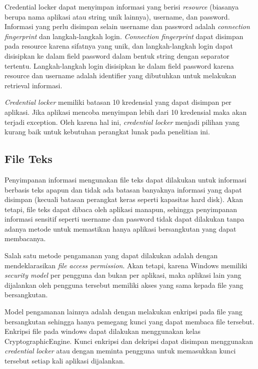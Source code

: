 Credential locker dapat menyimpan informasi yang berisi \textit{resource} (biasanya berupa nama aplikasi atau string unik lainnya), username, dan password. Informasi yang perlu disimpan selain username dan password adalah \textit{connection fingerprint} dan langkah-langkah login. \textit{Connection fingerprint} dapat disimpan pada resource karena sifatnya yang unik, dan langkah-langkah login dapat disisipkan ke dalam field password dalam bentuk string dengan separator tertentu. Langkah-langkah login disisipkan ke dalam field password karena resource dan username adalah identifier yang dibutuhkan untuk melakukan retrieval informasi.

\textit{Credential locker} memiliki batasan 10 kredensial yang dapat disimpan per aplikasi. Jika aplikasi mencoba menyimpan lebih dari 10 kredensial maka akan terjadi exception. Oleh karena hal ini, \textit{credential locker} menjadi pilihan yang kurang baik untuk kebutuhan perangkat lunak pada penelitian ini.

\subsection{File Teks}
\label{subsec:file_teks}

Penyimpanan informasi mengunakan file teks dapat dilakukan untuk informasi berbasis teks apapun dan tidak ada batasan banyaknya informasi yang dapat disimpan (kecuali batasan perangkat keras seperti kapasitas hard disk). Akan tetapi, file teks dapat dibaca oleh aplikasi manapun, sehingga penyimpanan informasi sensitif seperti username dan password tidak dapat dilakukan tanpa adanya metode untuk memastikan hanya aplikasi bersangkutan yang dapat membacanya.

Salah satu metode pengamanan yang dapat dilakukan adalah dengan mendeklarasikan \textit{file access permission}. Akan tetapi, karena Windows memiliki \textit{security model} per pengguna dan bukan per aplikasi, maka aplikasi lain yang dijalankan oleh pengguna tersebut memiliki akses yang sama kepada file yang bersangkutan.

Model pengamanan lainnya adalah dengan melakukan enkripsi pada file yang bersangkutan sehingga hanya pemegang kunci yang dapat membaca file tersebut. Enkripsi file pada windows dapat dilakukan menggunakan kelas CryptographicEngine. Kunci enkripsi dan dekripsi dapat disimpan menggunakan \textit{credential locker} atau dengan meminta pengguna untuk memasukkan kunci tersebut setiap kali aplikasi dijalankan.



